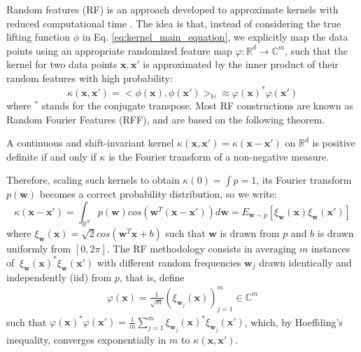 \documentclass{article}
\begin{document}
Random features (RF) is an approach developed to approximate kernels with reduced computational time  \cite{rahimi2008random}. The idea is that, instead of considering the true lifting function $\phi$ in Eq. \ref{eq:kernel_main_equation}, we explicitly map the data points using an appropriate randomized feature map $\varphi:\mathbb{R}^d \xrightarrow{}\mathbb{C}^m$, such that the kernel for two data points $\mathbf{x}, \mathbf{x}'$ is approximated by the inner product of their random features with high probability:
\begin{equation}
\label{eq:approx_RF}
\kappa(\mathbf{x},\mathbf{x}')=<\phi(\mathbf{x}),\phi(\mathbf{x}')>_\mathbb{H} \approx \varphi(\mathbf{x})^*\varphi(\mathbf{x}')
\end{equation}
where $^*$ stands for the conjugate transpose. Most RF constructions are known as Random Fourier Features (RFF), and are based on
the following theorem.
\begin{theorem}
	A continuous and shift-invariant kernel $\kappa(\mathbf{x},\mathbf{x}')=\kappa(\mathbf{x}-\mathbf{x}')$ on $\mathbb{R}^d$ is positive definite if and only if $\kappa$ is the Fourier transform of a non-negative measure.
\end{theorem}
Therefore, scaling such kernels to obtain $\kappa(0) = \int p = 1$,   its Fourier transform $p(\mathbf{w})$ becomes a correct probability distribution, so we write:
\begin{equation}
\label{eq:real_Fourier_integral}
\kappa(\mathbf{x}-\mathbf{x}')=\int_{\mathbb{R}^d}p(\mathbf{w})cos({\mathbf{w}^T(\mathbf{x}-\mathbf{x}')})d\mathbf{w}=E_{\mathbf{w}\sim p}[ \xi_\mathbf{w}(\mathbf{x}) \xi_\mathbf{w}(\mathbf{x}')]
\end{equation}
where $ \xi_\mathbf{w}(\mathbf{x})=\sqrt{2}cos(\mathbf{w}^T\mathbf{x}+b)$ such that $\mathbf{w}$ is drawn from $p$ and $b$ is drawn uniformly from $[0,2\pi]$. The RF methodology consists in averaging $m$ instances of $\  \xi_\mathbf{w}(\mathbf{x})^*  \xi_\mathbf{w}(\mathbf{x}')$  with different random frequencies $\mathbf{w}_j$ drawn identically and independently (iid) from $p$, that is, define
\begin{align}
	\label{eq:def_RF}
	\varphi(\mathbf{x}) = \frac{1}{\sqrt{m}} ( \xi_{\mathbf{w}_j}(\mathbf{x}) )_{j=1}^m \in \mathbb{C}^m
\end{align}
such that $\varphi(\mathbf{x})^*\varphi(\mathbf{x}')=\frac{1}{m} \sum_{j=1}^m \xi_{\mathbf{w}_j}(\mathbf{x})^*\xi_{\mathbf{w}_j}(\mathbf{x}')$, which, by Hoeffding's inequality, converges exponentially in $m$ to $\kappa(\mathbf{x},\mathbf{x}')$.
\fi
\end{document}
